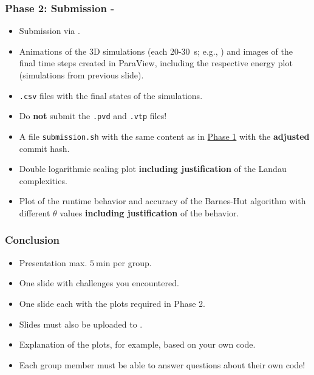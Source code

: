 \begin{frame}[fragile]
    \frametitle{Phase 2: Submission - \dateDeadlinePhaseTwo}
    \begin{itemize}
        \item Submission via .
        \item Animations of the 3D simulations (each \num{20}-\SI{30}{\second}; e.g., ) and images of the final time steps created in ParaView, including the respective energy plot (simulations from previous slide).
        \item \texttt{.csv} files with the final states of the simulations.
        \item Do \textbf{not} submit the \texttt{.pvd} and \texttt{.vtp} files!
        \item A file \texttt{submission.sh} with the same content as in \hyperref[phase1_anforderungen]{Phase 1} with the \textbf{adjusted} commit hash.
        \item Double logarithmic scaling plot \textbf{including justification} of the Landau complexities.
        \item Plot of the runtime behavior and accuracy of the Barnes-Hut algorithm with different $\theta$ values \textbf{including justification} of the behavior.
    \end{itemize}
\end{frame}

\begin{frame}[fragile]
    \frametitle{Conclusion}
    \begin{itemize}
    \item Presentation max. $\SI{5}{\minute}$ per group.
    \item One slide with challenges you encountered.
    \item One slide each with the plots required in Phase 2.
    \item Slides must also be uploaded to .
    \item Explanation of the plots, for example, based on your own code.
    \item Each group member must be able to answer questions about their own code!
    \end{itemize}
\end{frame}



